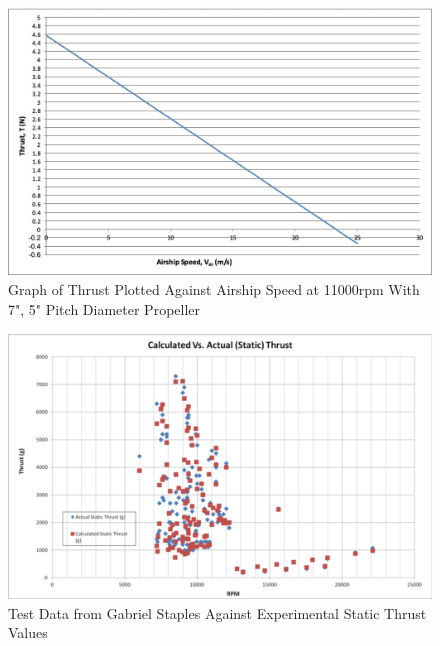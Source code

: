 \documentclass[../main.tex]{subfiles}
\begin{document}
\begin{figure}[H]
	\centering
	\includegraphics[width=1\textwidth]{img/thrust/thrustours.jpg}
	\caption{Graph of Thrust Plotted Against Airship Speed at 11000rpm With 7", 5" Pitch Diameter Propeller}
	\label{fig:thrusttablours}
\end{figure}
\begin{figure}[H]
	\centering
	\includegraphics[width=1\textwidth]{img/thrust/thruststatictest.jpg}
	\caption{Test Data from Gabriel Staples Against Experimental Static Thrust Values \cite{thrusteq}}
	\label{fig:thruststatictest}
\end{figure}
\end{document}
